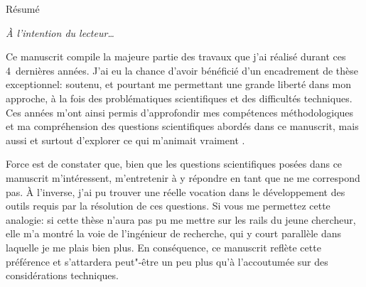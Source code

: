 
\thispagestyle{thesis-empty}

Résumé

\begin{comment}

\clearpage
\thispagestyle{thesis-empty}

\section*{Remerciements}
\label{sec:thanks}

la colloc étendu: théo, thomas, arthur, rémi, rémy, clément, sarah
parler du confinement ?
les potos: benjamin, marie, charlie, paul, jessie, piwi

la mifa

mon comité de thèse ? Sakina, Daniele

le 426 le meilleur bureau, tous les autres doctorants et post-doctorants et stagiaires
c'est quand même vachement plus fun avec elleux.

l'équipe admin du labo, bigup
\end{comment}

\clearpage
\thispagestyle{thesis-empty}

\vspace*{5ex}
\par\addvspace{\beforesecskip}\addvspace{\baselineskip}
\par\noindent\textit{À l'intention du lecteur\dots}\par
\vspace{\aftersecskip}

Ce manuscrit compile la majeure partie des travaux que j'ai réalisé durant ces 4~dernières années.
J'ai eu la chance d'avoir bénéficié d'un encadrement de thèse exceptionnel: soutenu, et pourtant me permettant une grande liberté dans mon approche, à la fois des problématiques scientifiques et des difficultés techniques.
Ces années m'ont ainsi permis d'approfondir mes compétences méthodologiques et ma compréhension des questions scientifiques abordés dans ce manuscrit, mais aussi et surtout d'explorer ce qui m'animait vraiment .

Force est de constater que, bien que les questions scientifiques posées dans ce manuscrit m'intéressent, m'entretenir à y répondre en tant que  ne me correspond pas.
À l'inverse, j'ai pu trouver une réelle vocation dans le développement des outils requis par la résolution de ces questions.
Si vous me permettez cette analogie: si cette thèse n'aura pas pu me mettre sur les rails du jeune chercheur, elle m'a montré la voie de l'ingénieur de recherche, qui y court parallèle dans laquelle je me plais bien plus.
En conséquence, ce manuscrit reflète cette préférence et s'attardera peut"-être un peu plus qu'à l'accoutumée sur des considérations techniques.


